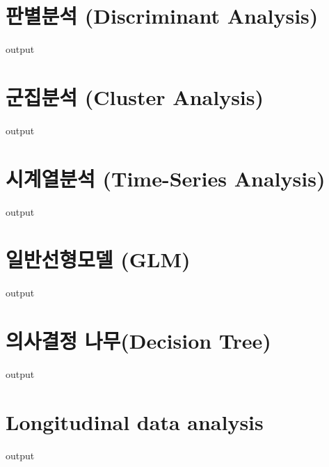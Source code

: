 \documentclass{report}
\begin{document}
\section{판별분석 (Discriminant Analysis) }
\begin{Schunk}
\begin{Soutput}
output
\end{Soutput}
\end{Schunk}

\section{군집분석 (Cluster Analysis) }
\begin{Schunk}
\begin{Soutput}
output
\end{Soutput}
\end{Schunk}

\section{시계열분석 (Time-Series Analysis) }
\begin{Schunk}
\begin{Soutput}
output
\end{Soutput}
\end{Schunk}

\section{일반선형모델 (GLM)}
\begin{Schunk}
\begin{Soutput}
output
\end{Soutput}
\end{Schunk}

\section{의사결정 나무(Decision Tree)}
\begin{Schunk}
\begin{Soutput}
output
\end{Soutput}
\end{Schunk}

\section{Longitudinal data analysis}
\begin{Schunk}
\begin{Soutput}
output
\end{Soutput}
\end{Schunk}
\end{document}
